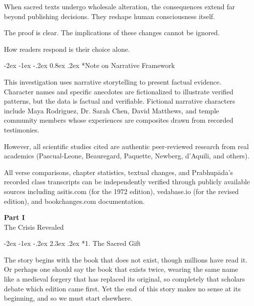 \documentclass[12pt,twoside]{book}
\makeatletter
\renewcommand\section{\@startsection{section}{1}{\z@}%
{-3.5ex \@plus -1ex \@minus -.2ex}%
{2.3ex \@plus.2ex}%
{\normalfont\Large\bfseries}}
\let\oldsection\section
\renewcommand{\section}[1]{\needspace{4\baselineskip}\oldsection{#1}}
\let\oldsubsection\subsection
\renewcommand{\subsection}[1]{\needspace{3\baselineskip}\oldsubsection{#1}}
\def\cleardoublepage{\clearpage\if@twoside \ifodd\c@page\else\hbox{}\thispagestyle{empty}\newpage\if@twocolumn\hbox{}\newpage\fi\fi\fi}
\renewcommand\section{\@startsection{section}{1}{\z@}%
{-2ex \@plus -1ex \@minus -.2ex}%
{2.3ex \@plus.2ex}%
{\normalfont\Large\bfseries}}
\renewcommand\subsection{\@startsection{subsection}{2}{\z@}%
{-2ex \@plus -1ex \@minus -.2ex}%
{0.8ex \@plus .2ex}%
{\normalfont\large\bfseries}}
\makeatother
\begin{document}
When sacred texts undergo wholesale alteration, the consequences extend far beyond publishing decisions. They reshape human consciousness itself.

The proof is clear. The implications of these changes cannot be ignored.

How readers respond is their choice alone.

\clearpage

\subsection*{Note on Narrative Framework}

\normalfont\justifying
This investigation uses narrative storytelling to present factual evidence. Character names and specific anecdotes are fictionalized to illustrate verified patterns, but the data is factual and verifiable. Fictional narrative characters include Maya Rodriguez, Dr. Sarah Chen, David Matthews, and temple community members whose experiences are composites drawn from recorded testimonies.

However, all scientific studies cited are authentic peer-reviewed research from real academics (Pascual-Leone, Beauregard, Paquette, Newberg, d'Aquili, and others).

All verse comparisons, chapter statistics, textual changes, and Prabhupāda's recorded class transcripts can be independently verified through publicly available sources including asitis.com (for the 1972 edition), vedabase.io (for the revised edition), and bookchanges.com documentation.

\cleardoublepage
\pagestyle{empty}
\vspace*{0.20\textheight}
\begin{center}
{\Huge\bfseries Part I}\\[0.5cm]
{\Large The Crisis Revealed}
\end{center}
\vspace*{\fill}
\cleardoublepage
\pagestyle{fancy}
\vspace*{0.20\textheight}
\section*{1. The Sacred Gift}
\thispagestyle{chapterpage}

\normalfont\justifying
The story begins with the book that does not exist, though millions have read it. Or perhaps one should say the book that exists twice, wearing the same name like a medieval forgery that has replaced its original, so completely that scholars debate which edition came first. Yet the end of this story makes no sense at its beginning, and so we must start elsewhere.
\end{document}
